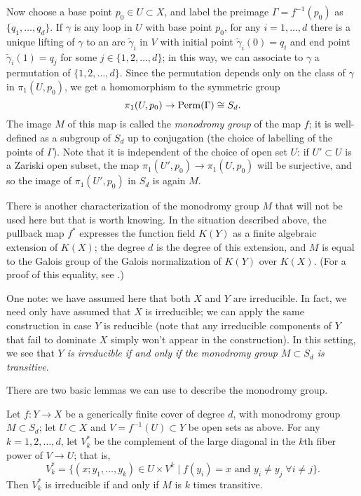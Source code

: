 Now choose a base point $p_0 \in U \subset X$, and label the preimage $\Gamma = f^{-1}(p_0)$ as $\{q_1,\dots,q_d\}$. If $\gamma$ is any loop in $U$ with base point $p_0$, for any $i = 1, \dots, d$ there is a unique lifting of $\gamma$ to an arc $\tilde \gamma_i$ in $V$ with initial point $\tilde \gamma_i(0) = q_i$ and end point $\tilde \gamma_i(1) = q_j$ for some $j \in \{1,2,\dots,d\}$; in this way, we can associate to $\gamma$ a permutation of $\{1,2,\dots,d\}$. 
Since the permutation depends only on the class of $\gamma$ in $\pi_1(U,p_0)$, we get a homomorphism to the symmetric group
$$
\pi_1(U,p_0)  \to {\rm Perm}(\Gamma) \cong S_d.
$$
The image $M$ of this map is called the \emph{monodromy group} of the map $f$; it is well-defined as a subgroup of  $S_d$ up to conjugation (the choice of labelling of the points of $\Gamma$). Note that it is independent of the choice of open set $U$: if $U' \subset U$ is a Zariski open subset, the map $\pi_1(U', p_0) \to \pi_1(U,p_0)$ will be surjective, and so the image of $\pi_1(U', p_0)$ in $S_d$ is again $M$.

\begin{fact}
There is another characterization of the monodromy group $M$ that will not be used here but that is worth knowing. In the situation described above, the pullback map $f^*$ expresses the function field $K(Y)$ as a finite algebraic extension of $K(X)$; the degree $d$ is the degree of this extension, and $M$ is equal to the Galois group of the Galois normalization of $K(Y)$ over $K(X)$. (For a proof of this equality, see \cite{Harris}.)
\end{fact}

One note: we have assumed here that both $X$ and $Y$ are irreducible. In fact, we need only have assumed that $X$ is irreducible; we can apply the same construction in case $Y$ is reducible (note that any irreducible components of $Y$ that fail to dominate $X$ simply won't appear in the construction). In this setting, we see that \emph{$Y$ is irreducible if and only if the monodromy group $M \subset S_d$ is transitive}.


There are two basic lemmas we can use to describe the monodromy group.

\begin{lemma}\label{transitivity lemma}
Let $f : Y \to X$ be a generically finite cover of degree $d$, with  monodromy group $M \subset S_d$; let $U \subset X$ and $V = f^{-1}(U) \subset Y$ be open sets as above. For any $k = 1,2,\dots,d$, let $V_k^*$ be the complement of the large diagonal in the $k$th fiber power of $V \to U$; that is,
$$
V_k^* = \{ (x; y_1,\dots, y_k) \in U \times V^k \mid f(y_i) = x \text{ and } y_i \neq y_j \; \forall i \neq j\}.
$$
Then $V_k^*$ is irreducible if and only if $M$ is $k$ times transitive.
\end{lemma}


